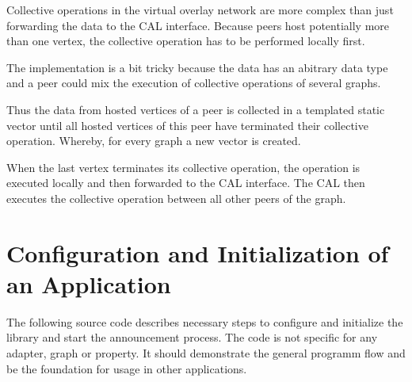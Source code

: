 Collective operations in the virtual overlay network are more complex
than just forwarding the data to the CAL interface. Because peers host
potentially more than one vertex, the collective operation has to be
performed locally first.

The implementation is a bit tricky because the data has an abitrary
data type and a peer could mix the execution of collective operations
of several graphs.

Thus the data from hosted vertices of a peer is collected in a
templated static vector until all hosted vertices of this peer have
terminated their collective operation. Whereby, for every graph a new
vector is created.

When the last vertex terminates its collective operation, the
operation is executed locally and then forwarded to the CAL
interface. The CAL then executes the collective operation between all
other peers of the graph.


\section{Configuration and Initialization of an Application}
The following source code describes necessary steps to configure and
initialize the library and start the announcement process. The code is
not specific for any adapter, graph or property. It should demonstrate
the general programm flow and be the foundation for usage in other
applications.

